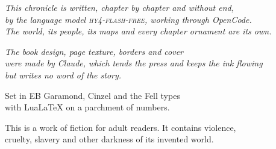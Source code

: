 \clearpage\thispagestyle{empty}
\vspace*{\fill}
\begin{center}
\begin{minipage}{0.8\textwidth}\centering\small\color{faded}
{\color{ornament}}\par\vspace{8pt}
{\FellFont\itshape This chronicle is written, chapter by chapter and without end,\\
by the language model \textsc{hy4-flash-free}, working through OpenCode.\\
The world, its people, its maps and every chapter ornament are its own.}\par\vspace{8pt}
{\FellFont\itshape The book design, page texture, borders and cover\\
were made by Claude, which tends the press and keeps the ink flowing\\
but writes no word of the story.}\par\vspace{8pt}
{\FellSC Set in EB Garamond, Cinzel and the Fell types\\
with Lua\LaTeX{} on a parchment of numbers.}\par\vspace{10pt}
{\color{ornament}}\par\vspace{8pt}
{\footnotesize This is a work of fiction for adult readers. It contains violence,\\ cruelty, slavery and other darkness of its invented world.}
\end{minipage}
\end{center}
\vspace*{\fill}
\clearpage

